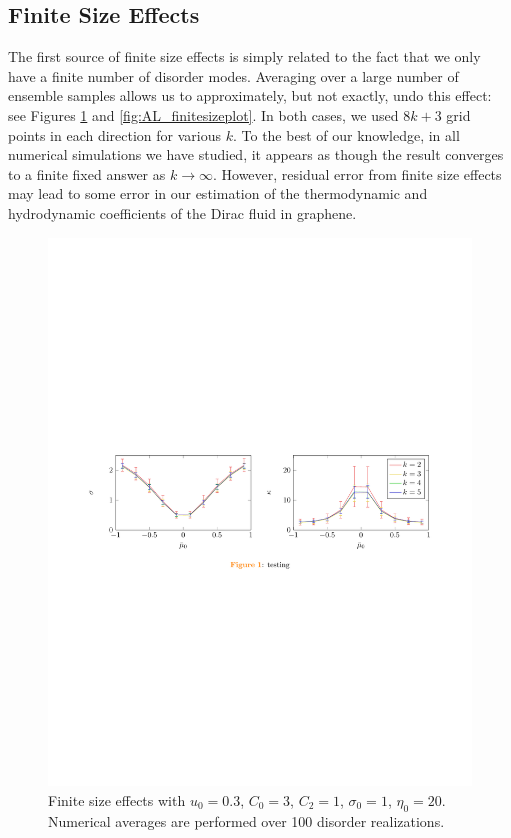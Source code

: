  
\subsection{Finite Size Effects}
The first source of finite size effects is simply related to the fact that we only have a finite number of disorder modes.   Averaging over a large number of ensemble samples allows us to approximately, but not exactly, undo this effect:  see Figures \ref{fig:AL_finitesize2plot} and  \ref{fig:AL_finitesizeplot}.   In both cases,  we used $8k+3$ grid points in each direction for various $k$.   To the best of our knowledge, in all numerical simulations we have studied, it appears as though the result converges to a finite fixed answer as $k\rightarrow \infty$.  However, residual error from finite size effects may lead to some error in our estimation of the thermodynamic and hydrodynamic coefficients of the Dirac fluid in graphene.

\begin{figure}[t]
\centering
\includegraphics[width=7in]{figures/appendix/finitesizeplot2.pdf}
\caption{Finite size effects with $u_0=0.3$, $C_0=3$, $C_2=1$, $\sigma_0=1$, $\eta_0=20$.  Numerical averages are performed over 100 disorder realizations.}
\label{fig:AL_finitesize2plot}
\end{figure}

